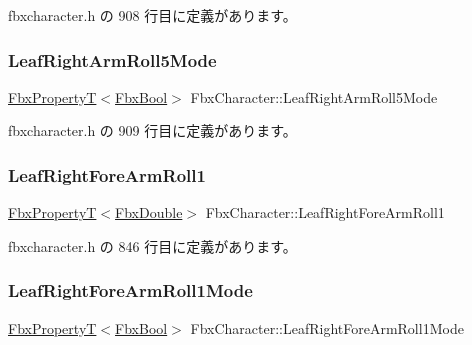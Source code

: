  fbxcharacter.\+h の 908 行目に定義があります。

\mbox{\label{class_fbx_character_a49c22d541bd008482ad38478ddb7c611}} 
\subsubsection{\texorpdfstring{Leaf\+Right\+Arm\+Roll5\+Mode}{LeafRightArmRoll5Mode}}
{\footnotesize\ttfamily \hyperlink{class_fbx_property_t}{Fbx\+PropertyT}$<$\hyperlink{fbxtypes_8h_a92e0562b2fe33e76a242f498b362262e}{Fbx\+Bool}$>$ Fbx\+Character\+::\+Leaf\+Right\+Arm\+Roll5\+Mode}



 fbxcharacter.\+h の 909 行目に定義があります。

\mbox{\label{class_fbx_character_a7f7a019b3eb58537713d44cbb3652d1b}} 
\subsubsection{\texorpdfstring{Leaf\+Right\+Fore\+Arm\+Roll1}{LeafRightForeArmRoll1}}
{\footnotesize\ttfamily \hyperlink{class_fbx_property_t}{Fbx\+PropertyT}$<$\hyperlink{fbxtypes_8h_a171e72a1c46fc15c1a6c9c31948c1c5b}{Fbx\+Double}$>$ Fbx\+Character\+::\+Leaf\+Right\+Fore\+Arm\+Roll1}



 fbxcharacter.\+h の 846 行目に定義があります。

\mbox{\label{class_fbx_character_acf6a65fcc55fd8b93c2fcd3f5330ade7}} 
\subsubsection{\texorpdfstring{Leaf\+Right\+Fore\+Arm\+Roll1\+Mode}{LeafRightForeArmRoll1Mode}}
{\footnotesize\ttfamily \hyperlink{class_fbx_property_t}{Fbx\+PropertyT}$<$\hyperlink{fbxtypes_8h_a92e0562b2fe33e76a242f498b362262e}{Fbx\+Bool}$>$ Fbx\+Character\+::\+Leaf\+Right\+Fore\+Arm\+Roll1\+Mode}



